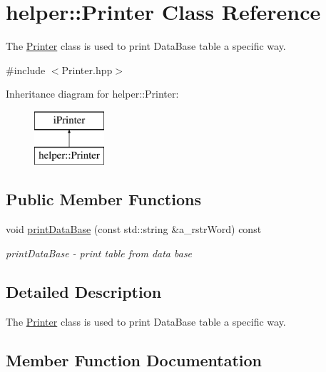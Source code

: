 \hypertarget{classhelper_1_1_printer}{}\section{helper\+::Printer Class Reference}
\label{classhelper_1_1_printer}


The \mbox{\hyperlink{classhelper_1_1_printer}{Printer}} class is used to print Data\+Base table a specific way.  




{\ttfamily \#include $<$Printer.\+hpp$>$}

Inheritance diagram for helper\+::Printer\+:\begin{figure}[H]
\begin{center}
\leavevmode
\includegraphics[height=2.000000cm]{classhelper_1_1_printer}
\end{center}
\end{figure}
\subsection*{Public Member Functions}
\begin{DoxyCompactItemize}
\item 
void \mbox{\hyperlink{classhelper_1_1_printer_a82832dc1d20b62bc17bb40212c814d92}{print\+Data\+Base}} (const std\+::string \&a\+\_\+rstr\+Word) const
\begin{DoxyCompactList}\small\item\em print\+Data\+Base -\/ print table from data base \end{DoxyCompactList}\end{DoxyCompactItemize}


\subsection{Detailed Description}
The \mbox{\hyperlink{classhelper_1_1_printer}{Printer}} class is used to print Data\+Base table a specific way. 

\subsection{Member Function Documentation}
\mbox{\label{classhelper_1_1_printer_a82832dc1d20b62bc17bb40212c814d92}} 
